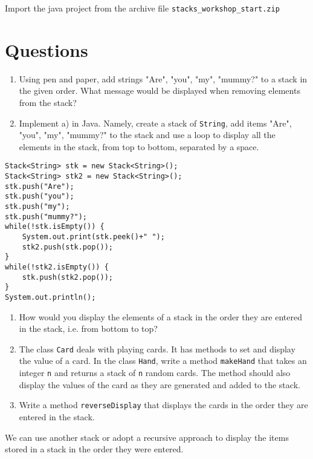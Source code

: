 Import the java project from the archive file \texttt{stacks\_workshop\_start.zip}

\section*{Questions}

\begin{questions}

\question 
\begin{enumerate}
\item Using pen and paper, add strings "Are", "you", "my", "mummy?" to a stack in the given order.
What message would be displayed when removing elements from the stack?
\item Implement a) in Java. Namely, create a stack of {\tt String},  add items "Are", "you", "my", "mummy?" to
  the stack and use a loop to display all the elements in the stack, from top to bottom, separated by a space.
\end{enumerate}
\begin{solution}
\begin{lstlisting}
Stack<String> stk = new Stack<String>();
Stack<String> stk2 = new Stack<String>();
stk.push("Are");
stk.push("you");
stk.push("my");
stk.push("mummy?");
while(!stk.isEmpty()) {
	System.out.print(stk.peek()+" ");
	stk2.push(stk.pop());
}
while(!stk2.isEmpty()) {
	stk.push(stk2.pop());
}
System.out.println();
\end{lstlisting}
\end{solution}

\question 
\begin{enumerate}
\item How would you display the elements of a stack in the order they are entered in the stack, i.e. from
  bottom to top?
\item The class {\tt Card} deals with playing cards. It has methods to set and display the value of a
card. In the class {\tt Hand}, write a method {\tt makeHand} that
takes an integer {\tt n} and returns a stack of {\tt n} random cards. The method should also display the values of the card as they are generated and added to the stack.
\item Write a method {\tt reverseDisplay} that displays the cards in the order they are entered in the stack.
\end{enumerate}

\begin{solution}
We can use another stack or adopt a recursive approach to display the items stored in a stack in the order they were entered.


\end{solution}
\end{questions}
